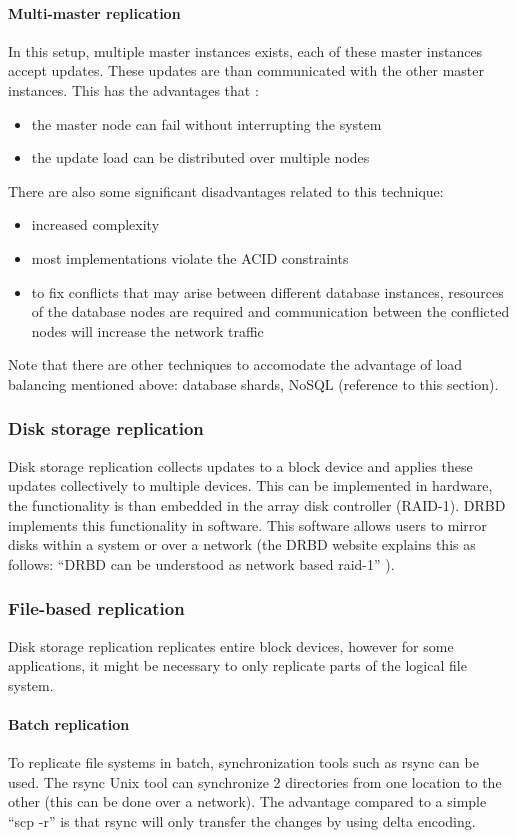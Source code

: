 \documentclass[12pt]{report}
\begin{document}
\paragraph*{Multi-master replication}
In this setup, multiple master instances exists, each of these master
instances accept updates. These updates are than communicated with the
other master instances. 
This has the advantages that :
\begin{itemize}
\item the master node can fail without interrupting the system
\item the update load can be distributed over multiple nodes
\end{itemize}
There are also some significant disadvantages related to this technique:
\begin{itemize} 
\item increased complexity
\item most implementations violate the ACID constraints
\item to fix conflicts that may arise between different database
  instances, resources of the database nodes are required and
  communication between the conflicted nodes will increase the network
  traffic
\end{itemize}
Note that there are other techniques to accomodate the advantage of
load balancing mentioned above: database shards, NoSQL (reference to
this section).

\subsubsection{Disk storage replication}
Disk storage replication collects updates to a block device and
applies these updates collectively to multiple devices.
This can be implemented in hardware, the functionality is than
embedded in the array disk controller (RAID-1).
DRBD \cite{drbd_soft:2013} implements this functionality in software.
This software allows users to mirror disks within a system or over a
network (the DRBD website explains this as follows: ``DRBD can be
understood as network based raid-1'' \cite{drbd_soft:2013}).

\subsubsection{File-based replication}
Disk storage replication replicates entire block devices, however for
some applications, it might be necessary to only replicate parts of
the logical file system.
\paragraph*{Batch replication}
To replicate file systems in batch, synchronization tools such as
rsync \cite{rsync_software:2013} can be
used. The rsync Unix tool can synchronize 2 directories from one location to the
other (this can be done over a network). The advantage compared to a
simple ``scp -r'' is that rsync will only transfer the changes by using
delta encoding.
\end{document}
